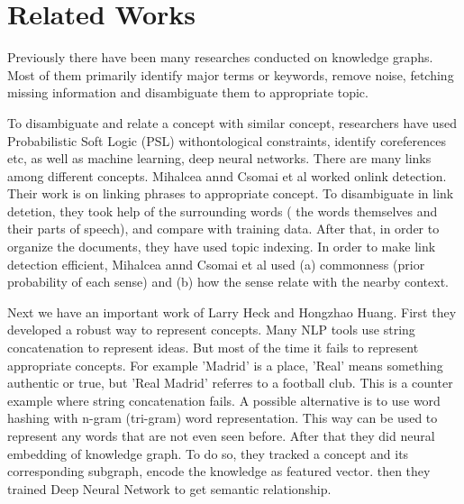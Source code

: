 \chapter{Related Works}\label{intro}
Previously there have been many researches conducted on knowledge graphs.
Most of them primarily identify major terms or keywords, remove noise, 
fetching missing information and disambiguate them to appropriate topic.
 

 
To disambiguate and relate a concept with similar concept,
researchers have used Probabilistic Soft Logic (PSL) withontological constraints,  
identify coreferences etc, as well as machine learning, deep neural networks.
There are many links among different concepts. Mihalcea annd Csomai et al worked onlink detection. 
Their work is on linking phrases to appropriate concept. To disambiguate in link detetion, they 
took help of the surrounding words ( the words themselves and their parts of speech), and compare with training data.
After that, in order to organize the documents, they have used topic indexing.
In order to make link detection efficient, Mihalcea annd Csomai et al used (a) commonness (prior probability 
of each sense) and (b) how the sense relate with the nearby context.


 
Next we have an important work of Larry Heck and Hongzhao Huang. First they developed a robust way to represent concepts.
 Many NLP tools use string concatenation to represent ideas.
But most of the time it fails to represent appropriate concepts. For example 'Madrid' is a place, 'Real' means 
something authentic or true, but 'Real Madrid' referres to a football club. This is a counter example where string concatenation fails.
A possible alternative is to use word hashing with n-gram (tri-gram) word representation. This way can be
 used to represent any words that are not even seen before. After that they did neural embedding of knowledge graph. 
 To do so, they tracked a concept and its corresponding subgraph, encode the knowledge as featured vector.
 then they trained Deep Neural Network to get semantic relationship.

 





\endinput